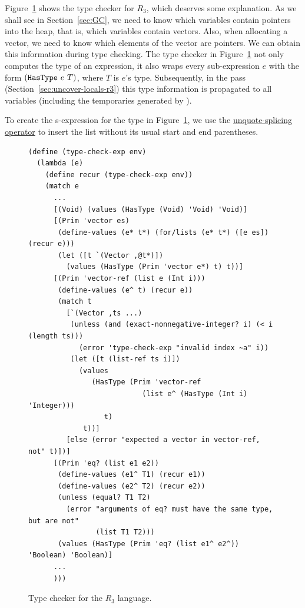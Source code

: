 \documentclass[11pt]{book}
\begin{document}
Figure~\ref{fig:typecheck-R3} shows the type checker for $R_3$, which
deserves some explanation. As we shall see in Section~\ref{sec:GC}, we
need to know which variables contain pointers into the heap, that is,
which variables contain vectors. Also, when allocating a vector, we
need to know which elements of the vector are pointers. We can obtain
this information during type checking. The type checker in
Figure~\ref{fig:typecheck-R3} not only computes the type of an
expression, it also wraps every sub-expression $e$ with the form
$(\texttt{HasType}~e~T)$, where $T$ is $e$'s type.
Subsequently, in the  pass
(Section~\ref{sec:uncover-locals-r3}) this type information is
propagated to all variables (including the temporaries generated by
).

To create the s-expression for the  type in
Figure~\ref{fig:typecheck-R3}, we use the
\href{https://docs.racket-lang.org/reference/quasiquote.html}{unquote-splicing
  operator}  to insert the list  without its usual
start and end parentheses.  


\begin{figure}[tp]
\begin{lstlisting}
(define (type-check-exp env)
  (lambda (e)
    (define recur (type-check-exp env))
    (match e
      ...
      [(Void) (values (HasType (Void) 'Void) 'Void)]
      [(Prim 'vector es)
       (define-values (e* t*) (for/lists (e* t*) ([e es]) (recur e)))
       (let ([t `(Vector ,@t*)])
         (values (HasType (Prim 'vector e*) t) t))]
      [(Prim 'vector-ref (list e (Int i)))
       (define-values (e^ t) (recur e))
       (match t
         [`(Vector ,ts ...)
          (unless (and (exact-nonnegative-integer? i) (< i (length ts)))
            (error 'type-check-exp "invalid index ~a" i))
          (let ([t (list-ref ts i)])
            (values
               (HasType (Prim 'vector-ref
                           (list e^ (HasType (Int i) 'Integer)))
                  t)
             t))]
         [else (error "expected a vector in vector-ref, not" t)])]
      [(Prim 'eq? (list e1 e2))
       (define-values (e1^ T1) (recur e1))
       (define-values (e2^ T2) (recur e2))
       (unless (equal? T1 T2)
         (error "arguments of eq? must have the same type, but are not"
                (list T1 T2)))
       (values (HasType (Prim 'eq? (list e1^ e2^)) 'Boolean) 'Boolean)]
      ...
      )))
\end{lstlisting}
\caption{Type checker for the $R_3$ language.}
\label{fig:typecheck-R3}
\end{figure}
\end{document}
